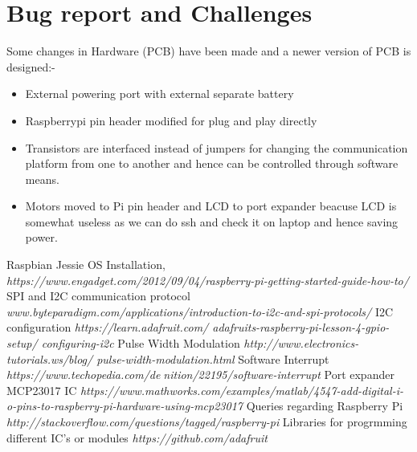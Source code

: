\documentclass[a4paper,12pt,oneside]{book}
\begin{document}
\section{Bug report and Challenges}
Some changes in Hardware (PCB) have been made and a newer version of PCB is designed:-
\begin{itemize}
\item External powering port with external separate battery
\item Raspberrypi pin header modified for plug and play directly
\item Transistors are interfaced instead of jumpers for changing the communication platform from one to another and hence can be controlled through software means.
\item Motors moved to Pi pin header and LCD to port expander beacuse LCD is somewhat useless as we can do ssh and check it on laptop and hence saving power.
\end{itemize}

\begin{thebibliography}{li}
Raspbian Jessie OS Installation,
{\em https://www.engadget.com/2012/09/04/raspberry-pi-getting-started-guide-how-to/}
SPI and I2C communication protocol
{\em www.byteparadigm.com/applications/introduction-to-i2c-and-spi-protocols/}
I2C configuration
{\em https://learn.adafruit.com/
adafruits-raspberry-pi-lesson-4-gpio-setup/
configuring-i2c}
Pulse Width Modulation
{\em http://www.electronics-tutorials.ws/blog/
pulse-width-modulation.html}
Software Interrupt
{\em https://www.techopedia.com/denition/22195/software-interrupt}
Port expander MCP23017 IC
{\em https://www.mathworks.com/examples/matlab/4547-add-digital-i-o-pins-to-raspberry-pi-hardware-using-mcp23017}
Queries regarding Raspberry Pi
{\em http://stackoverflow.com/questions/tagged/raspberry-pi}
Libraries for progrmming different IC's or modules
{\em https://github.com/adafruit}
\end{thebibliography}
\end{document}
